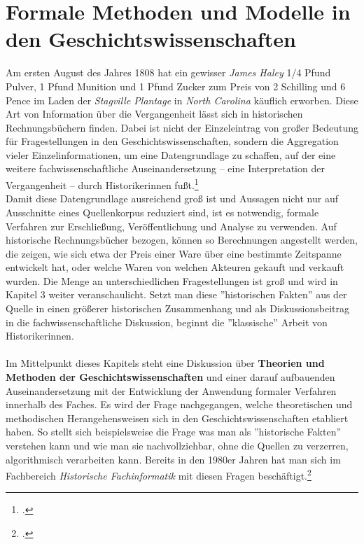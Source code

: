 \documentclass[12pt,a4paper]{article}
\begin{document}
\newpage
\section{Formale Methoden und Modelle in den Geschichtswissenschaften}
\label{section:FormaleMethoden}

Am ersten August des Jahres 1808 hat ein gewisser \textit{James Haley} 1/4 Pfund Pulver, 1 Pfund Munition und 1 Pfund Zucker zum Preis von 2 Schilling und 6 Pence im Laden der \textit{Stagville Plantage} in \textit{North Carolina} käuflich erworben. Diese Art von Information über die Vergangenheit lässt sich in historischen Rechnungsbüchern finden. Dabei ist nicht der Einzeleintrag von großer Bedeutung für Fragestellungen in den Geschichtswissenschaften, sondern die Aggregation vieler Einzelinformationen, um eine Datengrundlage zu schaffen, auf der eine weitere fachwissenschaftliche Auseinandersetzung -- eine Interpretation der Vergangenheit -- durch Historikerinnen fußt.\footcite[][06.06.2019]{vogeler2015mittelalterliche}
\\
Damit diese Datengrundlage ausreichend groß ist und Aussagen nicht nur auf Ausschnitte eines Quellenkorpus reduziert sind, ist es notwendig, formale Verfahren zur Erschließung, Veröffentlichung und Analyse zu verwenden. Auf historische Rechnungsbücher bezogen, können so Berechnungen angestellt werden, die zeigen, wie sich etwa der Preis einer Ware über eine bestimmte Zeitspanne entwickelt hat, oder welche Waren von welchen Akteuren gekauft und verkauft wurden. Die Menge an unterschiedlichen Fragestellungen ist groß und wird in Kapitel 3 weiter veranschaulicht. Setzt man diese ''historischen Fakten'' aus der Quelle in einen größerer historischen Zusammenhang und als Diskussionsbeitrag in die fachwissenschaftliche Diskussion, beginnt die ''klassische'' Arbeit von Historikerinnen. 
\\
\\
Im Mittelpunkt dieses Kapitels steht eine Diskussion über \textbf{Theorien und Methoden der Geschichtswissenschaften} und einer darauf aufbauenden Auseinandersetzung mit der Entwicklung der Anwendung formaler Verfahren innerhalb des Faches. Es wird der Frage nachgegangen, welche theoretischen und methodischen Herangehensweisen sich in den Geschichtswissenschaften etabliert haben. So stellt sich beispielsweise die Frage was man als ''historische Fakten'' verstehen kann und wie man sie nachvollziehbar, ohne die Quellen zu verzerren, algorithmisch verarbeiten kann. Bereits in den 1980er Jahren hat man sich im Fachbereich \textit{Historische Fachinformatik} mit diesen Fragen beschäftigt.\footcite[][S.260-286]{thaller2017historical}
\end{document}
